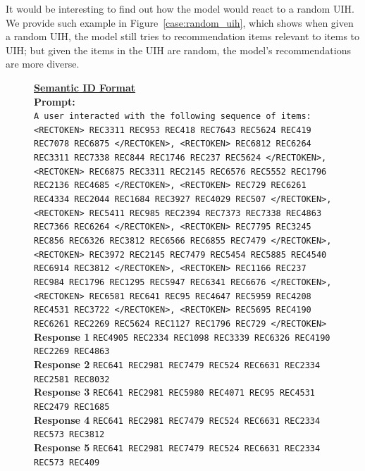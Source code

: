 \documentclass[]{fairmeta}
\begin{document}
It would be interesting to find out how the model would react to a random UIH. We provide such example in Figure~\ref{case:random_uih}, which shows when given a random UIH, the model still tries to recommendation items relevant to items to UIH; but given the items in the UIH are random, the model's recommendations are more diverse.
\begin{figure}[H]
  \begin{tcolorbox}[title={\textbf{Case Study: Recommendation given a Random UIH}},
                    colback=white, colframe=black!70]
  \begin{minipage}[t]{0.48\textwidth}
  \textbf{\underline{Semantic ID Format}}\\[0.5em]
  \textbf{Prompt:}\\
  {\footnotesize\texttt{A user interacted with the following sequence of items: <RECTOKEN> REC3311 REC953 REC418 REC7643 REC5624 REC419 REC7078 REC6875 </RECTOKEN>, <RECTOKEN> REC6812 REC6264 REC3311 REC7338 REC844 REC1746 REC237 REC5624 </RECTOKEN>, <RECTOKEN> REC6875 REC3311 REC2145 REC6576 REC5552 REC1796 REC2136 REC4685 </RECTOKEN>, <RECTOKEN> REC729 REC6261 REC4334 REC2044 REC1684 REC3927 REC4029 REC507 </RECTOKEN>, <RECTOKEN> REC5411 REC985 REC2394 REC7373 REC7338 REC4863 REC7366 REC6264 </RECTOKEN>, <RECTOKEN> REC7795 REC3245 REC856 REC6326 REC3812 REC6566 REC6855 REC7479 </RECTOKEN>, <RECTOKEN> REC3972 REC2145 REC7479 REC5454 REC5885 REC4540 REC6914 REC3812 </RECTOKEN>, <RECTOKEN> REC1166 REC237 REC984 REC1796 REC1295 REC5947 REC6341 REC6676 </RECTOKEN>, <RECTOKEN> REC6581 REC641 REC95 REC4647 REC5959 REC4208 REC4531 REC3722 </RECTOKEN>, <RECTOKEN> REC5695 REC4190 REC6261 REC2269 REC5624 REC1127 REC1796 REC729 </RECTOKEN>}}\\[0.3em]
  \textbf{Response 1} {\footnotesize\texttt{REC4905 REC2334 REC1098 REC3339 REC6326 REC4190 REC2269 REC4863}}\\
  \textbf{Response 2} {\footnotesize\texttt{REC641 REC2981 REC7479 REC524 REC6631 REC2334 REC2581 REC8032}}\\
  \textbf{Response 3} {\footnotesize\texttt{REC641 REC2981 REC5980 REC4071 REC95 REC4531 REC2479 REC1685}}\\
  \textbf{Response 4} {\footnotesize\texttt{REC641 REC2981 REC7479 REC524 REC6631 REC2334 REC573 REC3812}}\\
  \textbf{Response 5} {\footnotesize\texttt{REC641 REC2981 REC7479 REC524 REC6631 REC2334 REC573 REC409}}\\
  \end{minipage}

\end{tcolorbox}
\end{figure}
\end{document}
